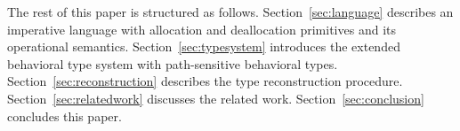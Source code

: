 The rest of this paper is structured as
follows. Section~\ref{sec:language} describes an imperative language
with allocation and deallocation primitives and its operational
semantics. Section~\ref{sec:typesystem} introduces the extended
behavioral type system with path-sensitive behavioral
types. Section~\ref{sec:reconstruction} describes the type
reconstruction procedure.
Section~\ref{sec:relatedwork} discusses the related work.
Section~\ref{sec:conclusion} concludes this paper.
